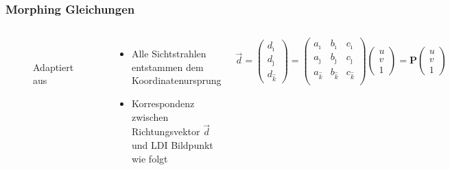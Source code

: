 \documentclass[aspectratio=169]{beamer}
\begin{document}
\begin{frame}
    \frametitle{Morphing Gleichungen}
    \begin{columns}
    \begin{figure}
        \centering
        \resizebox{\linewidth}{!}{}
        \\[-1ex]{\tiny Adaptiert aus~\cite{mcmillan1997image}}%
        \label{fig:ldicoord}
    \end{figure}
    
        \begin{itemize}
            \item Alle Sichtstrahlen entstammen dem Koordinatenursprung
            \item Korrespondenz zwischen Richtungsvektor \( \vec{d} \) und LDI Bildpunkt wie folgt
        \end{itemize}
        
        \begin{equation}
            \vec{d} =
            \begin{pmatrix}
                d_{\hat{\imath}} \\
                d_{\hat{\jmath}} \\
                d_{\hat{k}}
            \end{pmatrix} =
            \begin{pmatrix}
                a_{\hat{\imath}} &
                b_{\hat{\imath}} &
                c_{\hat{\imath}}   \\
                a_{\hat{\jmath}} &
                b_{\hat{\jmath}} &
                c_{\hat{\jmath}}   \\
                a_{\hat{k}}      &
                b_{\hat{k}}      &
                c_{\hat{k}}        \\
            \end{pmatrix}
            \begin{pmatrix}
                u \\
                v \\
                1
            \end{pmatrix} =
            \mathbf{P}
            \begin{pmatrix}
                u \\
                v \\
                1
            \end{pmatrix}
        \end{equation}
    \end{columns}
\end{frame}
\end{document}
